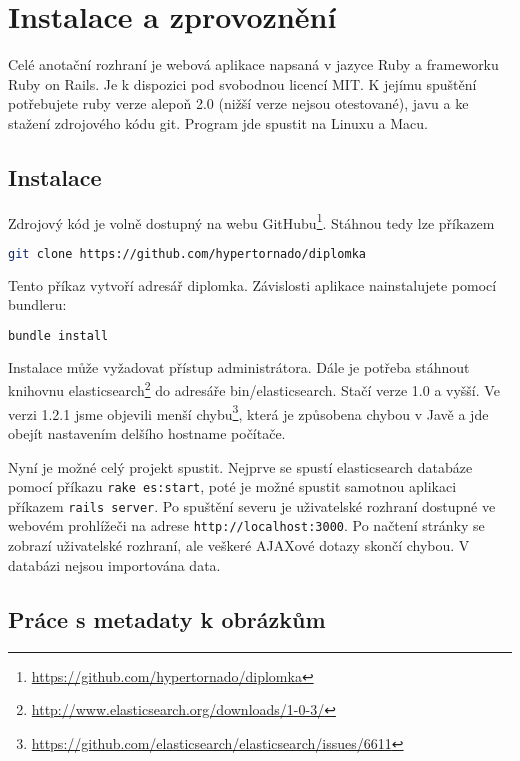 \chapter{Instalace a zprovoznění}
\label{chap:implementace}

Celé anotační rozhraní je webová aplikace napsaná v jazyce Ruby a frameworku Ruby on Rails. Je k dispozici pod svobodnou licencí MIT. K jejímu spuštění potřebujete ruby verze alepoň 2.0 (nižší verze nejsou otestované), javu a ke stažení zdrojového kódu git. Program jde spustit na Linuxu a Macu.

\section{Instalace}

Zdrojový kód je volně dostupný na webu GitHubu\footnote{\url{https://github.com/hypertornado/diplomka}}. Stáhnou tedy lze příkazem

\begin{lstlisting}[language=bash]
git clone https://github.com/hypertornado/diplomka
\end{lstlisting}

Tento příkaz vytvoří adresář diplomka. Závislosti aplikace nainstalujete pomocí bundleru:

\begin{lstlisting}[language=bash]
bundle install
\end{lstlisting}

Instalace může vyžadovat přístup administrátora. Dále je potřeba stáhnout knihovnu elasticsearch\footnote{\url{http://www.elasticsearch.org/downloads/1-0-3/}} do adresáře bin/elasticsearch. Stačí verze 1.0 a vyšší. Ve verzi 1.2.1 jsme objevili menší chybu\footnote{\url{https://github.com/elasticsearch/elasticsearch/issues/6611}}, která je způsobena chybou v Javě a jde obejít nastavením delšího hostname počítače.

Nyní je možné celý projekt spustit. Nejprve se spustí elasticsearch databáze pomocí příkazu \lstinline{rake es:start}, poté je možné spustit samotnou aplikaci příkazem \lstinline{rails server}. Po spuštění severu je uživatelské rozhraní dostupné ve webovém prohlížeči na adrese \lstinline{http://localhost:3000}. Po načtení stránky se zobrazí uživatelské rozhraní, ale veškeré AJAXové dotazy skončí chybou. V databázi nejsou importována data.

\section{Práce s metadaty k obrázkům}

